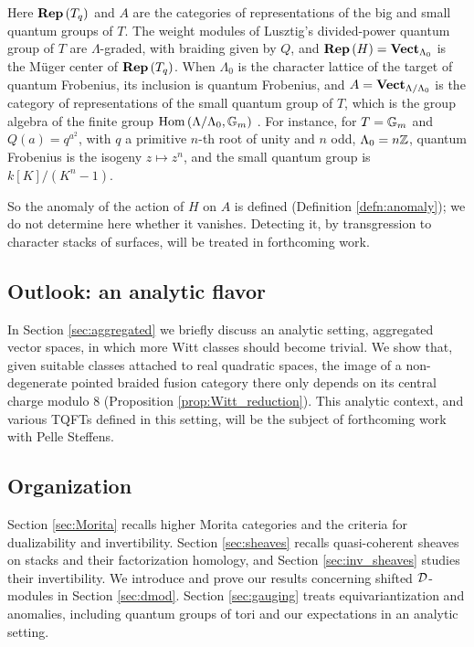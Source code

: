 Here $\mathbf{Rep}\left(T_q\right)$ and $A$ are the categories of representations of the big and small
quantum groups of $T$. The weight modules of Lusztig's divided-power quantum group of $T$ are
$\Lambda$-graded, with braiding given by $Q$, and $\mathbf{Rep}\left(H\right)=\mathbf{Vect}_{\Lambda_0}$ is the
M\"uger center of $\mathbf{Rep}\left(T_q\right)$. When $\Lambda_0$ is the character lattice of the target
of quantum Frobenius, its inclusion is quantum Frobenius, and $A=\mathbf{Vect}_{\Lambda/\Lambda_0}$ is the
category of representations of the small quantum group of $T$, which is the group algebra of the
finite group $\operatorname{Hom}\left(\Lambda/\Lambda_0,\mathbb{G}_m\right)$ \cite{AG:small}. For instance, for
$T=\mathbb{G}_m$ and $Q\left(a\right)=q^{a^2}$, with $q$ a primitive $n$-th root of unity and $n$ odd,
$\Lambda_0=n\mathbb{Z}$, quantum Frobenius is the isogeny $z\mapsto z^n$, and the small quantum group is
$k\left[K\right]/\left(K^n-1\right)$.

So the anomaly of the action of $H$ on $A$ is defined (Definition \ref{defn:anomaly}); we
do not determine here whether it vanishes. Detecting it, by transgression to character
stacks of surfaces, will be treated in forthcoming work.

\subsection*{Outlook: an analytic flavor}
In Section \ref{sec:aggregated} we briefly discuss an analytic setting, aggregated vector spaces, in
which more Witt classes should become trivial. We show that, given suitable classes attached to
real quadratic spaces, the image of a non-degenerate pointed braided fusion category there only depends on its
central charge modulo $8$ (Proposition \ref{prop:Witt_reduction}).
This analytic context, and various TQFTs defined in this setting, will be the subject of
forthcoming work with Pelle Steffens.

\subsection*{Organization} 

Section \ref{sec:Morita} recalls higher Morita categories and the criteria for
dualizability and invertibility. Section \ref{sec:sheaves} recalls quasi-coherent sheaves
on stacks and their factorization homology, and Section \ref{sec:inv_sheaves} studies
their invertibility. 
We introduce and prove our results concerning shifted $\mathcal{D}$-modules in Section
\ref{sec:dmod}. Section \ref{sec:gauging} treats equivariantization and anomalies,
including quantum groups of tori and our expectations in an analytic setting.

